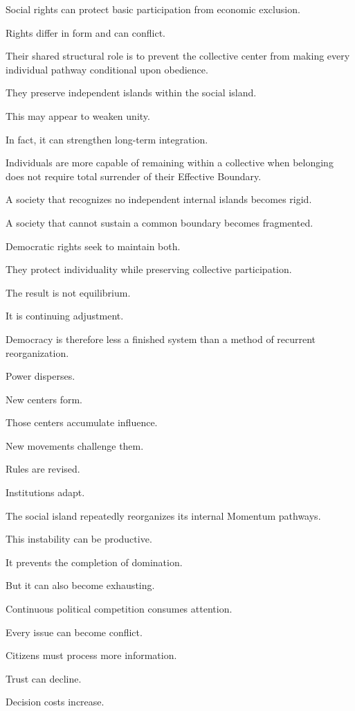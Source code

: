 Social rights can protect basic participation from economic exclusion.

Rights differ in form and can conflict.

Their shared structural role is to prevent the collective center from making every individual pathway conditional upon obedience.

They preserve independent islands within the social island.

This may appear to weaken unity.

In fact, it can strengthen long-term integration.

Individuals are more capable of remaining within a collective when belonging does not require total surrender of their Effective Boundary.

A society that recognizes no independent internal islands becomes rigid.

A society that cannot sustain a common boundary becomes fragmented.

Democratic rights seek to maintain both.

They protect individuality while preserving collective participation.

The result is not equilibrium.

It is continuing adjustment.

Democracy is therefore less a finished system than a method of recurrent reorganization.

Power disperses.

New centers form.

Those centers accumulate influence.

New movements challenge them.

Rules are revised.

Institutions adapt.

The social island repeatedly reorganizes its internal Momentum pathways.

This instability can be productive.

It prevents the completion of domination.

But it can also become exhausting.

Continuous political competition consumes attention.

Every issue can become conflict.

Citizens must process more information.

Trust can decline.

Decision costs increase.

